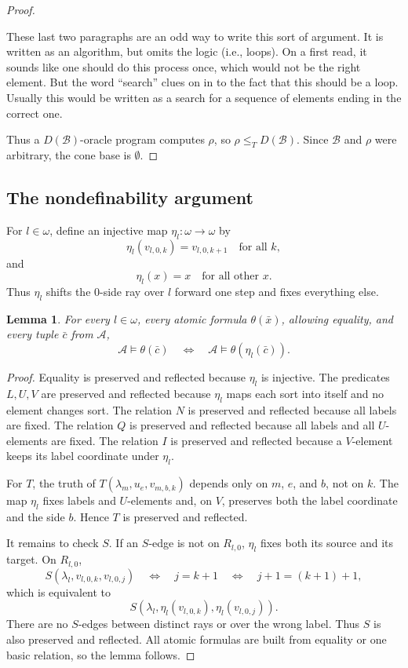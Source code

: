 \documentclass[12pt]{article}
\newtheorem{lemma}[theorem]{Lemma}
\theoremstyle{definition}
\theoremstyle{remark}
\newcommand{\review}[1]{\begin{reviewbox}#1\end{reviewbox}}
\begin{document}
\begin{proof}
\review{These last two paragraphs are an odd way to write this sort of argument. It is written as an algorithm, but omits the logic (i.e., loops). On a first read, it sounds like one should do this process once, which would not be the right element. But the word ``search'' clues on in to the fact that this should be a loop. Usually this would be written as a search for a sequence of elements ending in the correct one.}

Thus a \(D(\mathcal B)\)-oracle program computes \(\rho\), so \(\rho\leq_TD(\mathcal B)\).  Since \(\mathcal B\) and \(\rho\) were arbitrary, the cone base is \(\emptyset\).
\end{proof}

\subsection{The nondefinability argument}\label{sec:nondef}

For \(l\in\omega\), define an injective map \(\eta_l:\omega\to\omega\) by
\[
\eta_l(v_{l,0,k})=v_{l,0,k+1}
\quad\text{for all }k,
\]
and
\[
\eta_l(x)=x
\quad\text{for all other }x.
\]
Thus \(\eta_l\) shifts the \(0\)-side ray over \(l\) forward one step and fixes everything else.

\begin{lemma}\label{lem:eta-atomic}
For every \(l\in\omega\), every atomic formula \(\theta(\bar x)\), allowing equality, and every tuple \(\bar c\) from \(\mathcal A\),
\[
\mathcal A\models \theta(\bar c)
\quad\Longleftrightarrow\quad
\mathcal A\models \theta(\eta_l(\bar c)).
\]
\end{lemma}

\begin{proof}
Equality is preserved and reflected because \(\eta_l\) is injective.  The predicates \(L,U,V\) are preserved and reflected because \(\eta_l\) maps each sort into itself and no element changes sort.  The relation \(N\) is preserved and reflected because all labels are fixed.  The relation \(Q\) is preserved and reflected because all labels and all \(U\)-elements are fixed.  The relation \(I\) is preserved and reflected because a \(V\)-element keeps its label coordinate under \(\eta_l\).

For \(T\), the truth of \(T(\lambda_m,u_e,v_{m,b,k})\) depends only on \(m\), \(e\), and \(b\), not on \(k\).  The map \(\eta_l\) fixes labels and \(U\)-elements and, on \(V\), preserves both the label coordinate and the side \(b\).  Hence \(T\) is preserved and reflected.

It remains to check \(S\).  If an \(S\)-edge is not on \(R_{l,0}\), \(\eta_l\) fixes both its source and its target.  On \(R_{l,0}\),
\[
S(\lambda_l,v_{l,0,k},v_{l,0,j})
\quad\Longleftrightarrow\quad
j=k+1
\quad\Longleftrightarrow\quad
j+1=(k+1)+1,
\]
which is equivalent to
\[
S(\lambda_l,\eta_l(v_{l,0,k}),\eta_l(v_{l,0,j})).
\]
There are no \(S\)-edges between distinct rays or over the wrong label.  Thus \(S\) is also preserved and reflected.  All atomic formulas are built from equality or one basic relation, so the lemma follows.
\end{proof}
\end{document}
